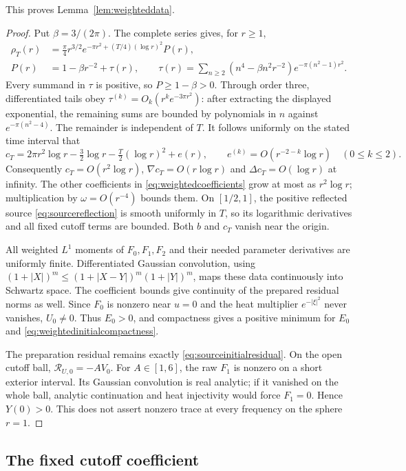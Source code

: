 \documentclass[11pt]{article}
\numberwithin{equation}{section}
\begin{document}
This proves Lemma~\ref{lem:weighteddata}.
\begin{proof}
Put $\beta=3/(2\pi)$. The complete series gives, for $r\ge1$,
\begin{align*}
 \rho_T(r)&=\frac\pi4r^{3/2}
   e^{-\pi r^2+(T/4)(\log r)^2}P(r),\\
 P(r)&=1-\beta r^{-2}+\tau(r),\qquad
 \tau(r)=\sum_{n\ge2}(n^4-\beta n^2r^{-2})
                   e^{-\pi(n^2-1)r^2}.
\end{align*}
Every summand in $\tau$ is positive, so $P\ge1-\beta>0$.
Through order three, differentiated tails obey
$\tau^{(k)}=O_k(r^ke^{-3\pi r^2})$: after extracting the displayed
exponential, the remaining sums are bounded by polynomials in $n$
against $e^{-\pi(n^2-4)}$. The remainder is independent of $T$.
It follows uniformly on the stated time interval that
\[
 c_T=2\pi r^2\log r-\tfrac32\log r
       -\tfrac T2(\log r)^2+e(r),\qquad
 e^{(k)}=O(r^{-2-k}\log r)\quad(0\le k\le2).
\]
Consequently $c_T=O(r^2\log r)$, $\nabla c_T=O(r\log r)$ and
$\Delta c_T=O(\log r)$ at infinity. The other coefficients in
\eqref{eq:weightedcoefficients} grow at most as $r^2\log r$;
multiplication by $\omega=O(r^{-4})$ bounds them. On $[1/2,1]$,
the positive reflected source \eqref{eq:sourcereflection} is smooth
uniformly in $T$, so its logarithmic derivatives and all fixed cutoff
terms are bounded. Both $b$ and $c_T$ vanish near the origin.

All weighted $L^1$ moments of $F_0,F_1,F_2$ and their needed parameter
derivatives are uniformly finite. Differentiated Gaussian convolution,
using $(1+|X|)^m\le(1+|X-Y|)^m(1+|Y|)^m$, maps these data continuously
into Schwartz space. The coefficient bounds give continuity of the
prepared residual norms as well. Since $F_0$ is nonzero near $u=0$
and the heat multiplier $e^{-|\xi|^2}$ never vanishes, $U_0\ne0$.
Thus $E_0>0$, and compactness gives a positive minimum for $E_0$ and
\eqref{eq:weightedinitialcompactness}.

The preparation residual remains exactly
\eqref{eq:sourceinitialresidual}. On the open cutoff ball,
$\mathcal R_{U,0}=-AV_0$. For $A\in[1,6]$, the raw $F_1$ is nonzero
on a short exterior interval. Its Gaussian convolution is real analytic;
if it vanished on the whole ball, analytic continuation and heat
injectivity would force $F_1=0$. Hence $Y(0)>0$. This does not assert
nonzero trace at every frequency on the sphere $r=1$.
\end{proof}

\subsection{The fixed cutoff coefficient}\label{app:cutoff}
\end{document}
